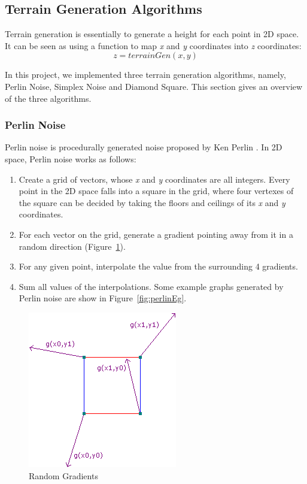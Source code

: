\subsection{Terrain Generation Algorithms}
Terrain generation is essentially to generate a height for each point in 2D space. It can be seen as using a function to map \textit{x} and \textit{y} coordinates into \textit{z} coordinates: \[z=terrainGen(x, y)\]

In this project, we implemented three terrain generation algorithms, namely, Perlin Noise, Simplex Noise and Diamond Square. This section gives an overview of the three algorithms.

\subsubsection{Perlin Noise}
Perlin noise is procedurally generated noise proposed by Ken Perlin \cite{perlin:2002}. In 2D space, Perlin noise works as follows:
\begin{enumerate}
	\item Create a grid of vectors, whose \textit{x} and \textit{y} coordinates are all integers. Every point in the 2D space falls into a square in the grid, where four vertexes of the square can be decided by taking the floors and ceilings of its \textit{x} and \textit{y} coordinates.
	\item For each vector on the grid, generate a gradient pointing away from it in a random direction (Figure~\ref{fig:randomGradients}).
	\item For any given point, interpolate the value from the surrounding 4 gradients.
	\item Sum all values of the interpolations. Some example graphs generated by Perlin noise are show in Figure~\ref{fig:perlinEg}.
\end{enumerate}
\begin{figure}
	\center
	\includegraphics[scale=0.5]{gradients.png}
	\caption{Random Gradients}
	\label{fig:randomGradients}
\end{figure}
